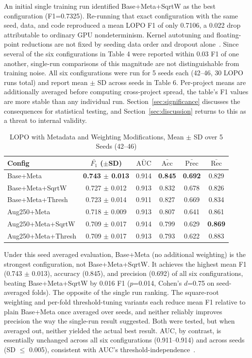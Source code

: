 \documentclass[preprint,12pt]{elsarticle}
\begin{document}
An initial single training run identified Base+Meta+SqrtW as the best configuration (F1=0.7325). Re-running that exact configuration with the same seed, data, and code reproduced a mean LOPO F1 of only 0.7106, a 0.022 drop attributable to ordinary GPU nondeterminism. Kernel autotuning and floating-point reductions are not fixed by seeding data order and dropout alone~\cite{zhuang2022}. Since several of the six configurations in Table 4 were reported within 0.03 F1 of one another, single-run comparisons of this magnitude are not distinguishable from training noise. All six configurations were run for 5 seeds each (42--46, 30 LOPO runs total) and report mean $\pm$ SD across seeds in Table 6. Per-project means are additionally averaged before computing cross-project spread, the table's F1 values are more stable than any individual run. Section~\ref{sec:significance} discusses the consequences for statistical testing, and Section~\ref{sec:discussion} returns to this as a threat to internal validity.

\begin{table}[t]
\centering
\label{tab:meta}
\setlength{\tabcolsep}{2.5pt}
\begin{tabular}{lccccc}
\toprule
\textbf{Config} & \textbf{$\bar{F_1}$ ($\pm$SD)} & \textbf{$\bar{\text{AUC}}$} & \textbf{$\bar{\text{Acc}}$} & \textbf{$\bar{\text{Prec}}$} & \textbf{$\bar{\text{Rec}}$} \\
\midrule
Base+Meta & \textbf{0.743 $\pm$ 0.013} & 0.914 & \textbf{0.845} & \textbf{0.692} & 0.829 \\
Base+Meta+SqrtW & 0.727 $\pm$ 0.012 & 0.913 & 0.832 & 0.678 & 0.826 \\
Base+Meta+Thresh & 0.723 $\pm$ 0.014 & 0.911 & 0.827 & 0.669 & 0.834 \\
Aug250+Meta & 0.718 $\pm$ 0.009 & 0.913 & 0.807 & 0.641 & 0.861 \\
Aug250+Meta+SqrtW & 0.709 $\pm$ 0.017 & 0.914 & 0.799 & 0.629 & \textbf{0.869} \\
Aug250+Meta+Thresh & 0.709 $\pm$ 0.017 & 0.913 & 0.793 & 0.622 & 0.883 \\
\bottomrule
\end{tabular}
\caption{LOPO with Metadata and Weighting Modifications, Mean $\pm$ SD over 5 Seeds (42--46)}
\end{table}

Under this seed averaged evaluation, Base+Meta (no additional weighting) is the strongest configuration, not Base+Meta+SqrtW. It achieves the highest mean F1 (0.743 $\pm$ 0.013), accuracy (0.845), and precision (0.692) of all six configurations, beating Base+Meta+SqrtW by 0.016 F1 ($p$=0.014, Cohen's $d$=0.75 on seed-averaged folds). The opposite of the single run ranking. The square-root weighting and per-fold threshold-tuning variants each reduce mean F1 relative to plain Base+Meta once averaged over seeds, and neither reliably improves precision the way the single-run result suggested. Both were tested, but when averaged out, neither yielded the actual best result. AUC, by contrast, is essentially unchanged across all six configurations (0.911--0.914) and across seeds (SD $\le$ 0.005), consistent with AUC's threshold-independence~\cite{fawcett2006}.
\end{document}
